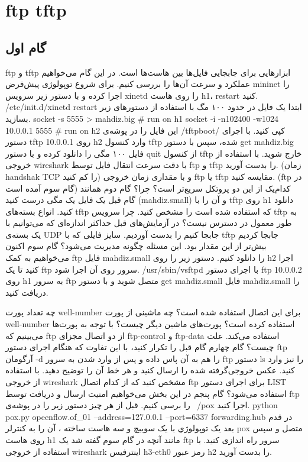 \documentclass[10pt,a4paper]{article}
\numberwithin{equation}{section}
\numberwithin{figure}{section}
\numberwithin{table}{section}
\begin{document}
\section{ftp  tftp}
\begin{otherlanguage}{farsi}
\subsection{گام اول}

ftp و tftp ابزارهایی برای جابجایی فایل‌ها بين‌ هاست‌ها است. در این گام می‌خواهيم عملکرد و سرعت آن‌ها را بررسی کنيم. برای شروع توپولوژی پيش‌فرض mininet را اجرا کرده و با دستور زیر سرویس xinetd را روی هاست h1، restart کنيد. 
 	/etc/init.d/xinetd restart
ابتدا یک فایل در حدود ۱۰۰ مگ با استفاده از دستورهای زیر بسازید.
 	socket -s 5555 > mahdiz.big # run on h1
 	 socket -i -n102400 -w1024 10.0.0.1 5555 # run on h2
این فایل را در پوشه‌ی /tftpboot/ کپی کنيد.
با اجرای دستور tftp 10.0.0.1 روی h2 وارد کنسول tftp شده، سپس با دستور get mahdiz.big فایل ۱۰۰ مگی را دانلود کرده و با دستور quit از کنسول tftp خارج شويد.
 	با استفاده از خروجی wireshark با دقت سرعت انتقال فایل توسط ftp و tftp را بدست آورید. (زمان handshak TCP را کم کنيد) و با مقداری زمان خروجی ftp یا tftp مقایسه کنيد. (ftp در گام سوم آمده است)
 	کدام‌یک از این دو پروتکل سریع‌تر است؟ چرا؟
گام دوم
همانند گام قبل یک فایل یک مگی درست کنيد (mahdiz.small) و آن را با tftp روی h1 دانلود کنيد.
 	انواع بسته‌های tftp که استفاده شده است را مشخص کنيد.
 	چرا سرویس tftp به طور معمول در دسترس نيست؟
 	در آزمایش‌های قبل حداکثر اندازه‌ای که می‌توانيم با یک بسته‌ی UDP جابجا کنيم را بدست آوردیم. سایز فایلی که با tftp جابجا کردیم بيش‌تر از این مقدار بود. این مسئله چگونه مديريت می‌شود؟
گام سوم
اکنون می‌خواهيم به کمک ftp فایل mahdiz.small را دانلود کنيم. دستور زیر را روی h2 اجرا کنيد تا یک ftp سرور روی آن اجرا شود.
 	/usr/sbin/vsftpd
با اجرای دستور ftp 10.0.0.2 روی h1 به سرور ftp متصل شويد و با دستور get mahdiz.small فایل mahdiz.small را دريافت کنيد.


 	چه تعداد پورت well-number برای این اتصال استفاده شده است؟ چه ماشينی از پورت  well-number استفاده کرده است؟ پورت‌های ماشين دیگر چيست؟
 	با توجه به پورت‌ها می‌بينيم که ftp از دو اتصال مجزای ftp-control و ftp-data استفاده می‌کند. علت چيست؟
گام چهارم
گام قبل را تکرار کنيد، با این تفاوت که هنگام اجرای دستور ftp آرگومان -d را هم به آن پاس داده و پس از وارد شدن به سرور ftp دستور ls را نيز وارد کنيد.
 	عکس خروجی‌گرفته شده را ارسال کنيد و هر خط آن را توضيح دهيد.
 	با استفاده از خروجی wireshark مشخص کنيد که از کدام اتصال ftp برای اجرای دستور LIST استفاده می‌شود؟
گام پنجم
در این بخش می‌خواهيم امنيت ارسال و دریافت توسط ftp را برسی کنيم. قبل از هر چيز دستور زیر را در پوشه‌ی ~/pox اجرا کنيد.
 	python pox.py opeenflow.of_01 --address=127.0.0.1 --port=6337 forwarding.hub
 در قدم بعد یک توپولوژي با یک سوييچ و سه هاست ساخته ، آن را به کنترلر pox متصل و سپس روی هاست h1  مانند آنچه در گام سوم گفته شد یک ftp سرور راه اندازی کنيد.
 	با استفاده از خروجی wireshark اینترفيس h3-eth0 رمز عبور h2 را بدست آورید.
\end{otherlanguage}
\end{document}
